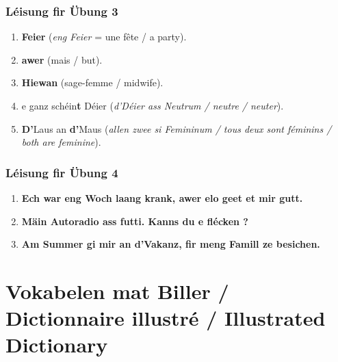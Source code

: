 \subsubsection*{Léisung fir Übung 3}
\begin{enumerate}
    \item \textbf{Feier} (\textit{eng Feier} = une fête / a party).
    \item \textbf{awer} (mais / but).
    \item \textbf{Hiewan} (sage-femme / midwife).
    \item e ganz schéin\textbf{t} Déier (\textit{d'Déier ass Neutrum / neutre / neuter}).
    \item \textbf{D'}Laus an \textbf{d'}Maus (\textit{allen zwee si Femininum / tous deux sont féminins / both are feminine}).
\end{enumerate}

\subsubsection*{Léisung fir Übung 4}
\begin{enumerate}
    \item \textbf{Ech war eng Woch laang krank, awer elo geet et mir gutt.}
    \item \textbf{Mäin Autoradio ass futti. Kanns du e flécken ?}
    \item \textbf{Am Summer gi mir an d'Vakanz, fir meng Famill ze besichen.}
\end{enumerate}

\vspace{2em}

\section[Vokabelen mat Biller / Picture Dictionary]{Vokabelen mat Biller / Dictionnaire illustré / Illustrated Dictionary}

